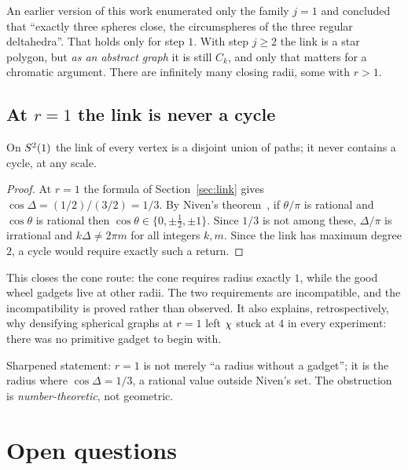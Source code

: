 \begin{remark}
An earlier version of this work enumerated only the family $j=1$ and concluded
that ``exactly three spheres close, the circumspheres of the three regular
deltahedra''. That holds only for step $1$. With step $j\ge2$ the link is a star
polygon, but \emph{as an abstract graph} it is still $C_k$, and only that
matters for a chromatic argument. There are infinitely many closing radii, some
with $r>1$.
\end{remark}

\subsection{At $r=1$ the link is never a cycle}
\label{sec:niven}

\begin{theorem}
\label{thm:niven}
On $S^2(1)$ the link of every vertex is a disjoint union of paths; it never
contains a cycle, at any scale.
\end{theorem}

\begin{proof}
At $r=1$ the formula of Section~\ref{sec:link} gives $\cos\Delta=(1/2)/(3/2)=1/3$. By
Niven's theorem~\cite{Niven1956}, if $\theta/\pi$ is rational and $\cos\theta$ is rational then
$\cos\theta\in\{0,\pm\tfrac12,\pm1\}$. Since $1/3$ is not among these,
$\Delta/\pi$ is irrational and $k\Delta\ne2\pi m$ for all integers $k,m$. Since
the link has maximum degree $2$, a cycle would require exactly such a return.
\end{proof}

This closes the cone route: the cone requires radius exactly $1$, while the good
wheel gadgets live at other radii. The two requirements are incompatible, and
the incompatibility is proved rather than observed. It also explains,
retrospectively, why densifying spherical graphs at $r=1$ left $\chi$ stuck at
$4$ in every experiment: there was no primitive gadget to begin with.

Sharpened statement: $r=1$ is not merely ``a radius without a gadget''; it is
the radius where $\cos\Delta=1/3$, a rational value outside Niven's set. The
obstruction is \emph{number-theoretic}, not geometric.

\section{Open questions}

